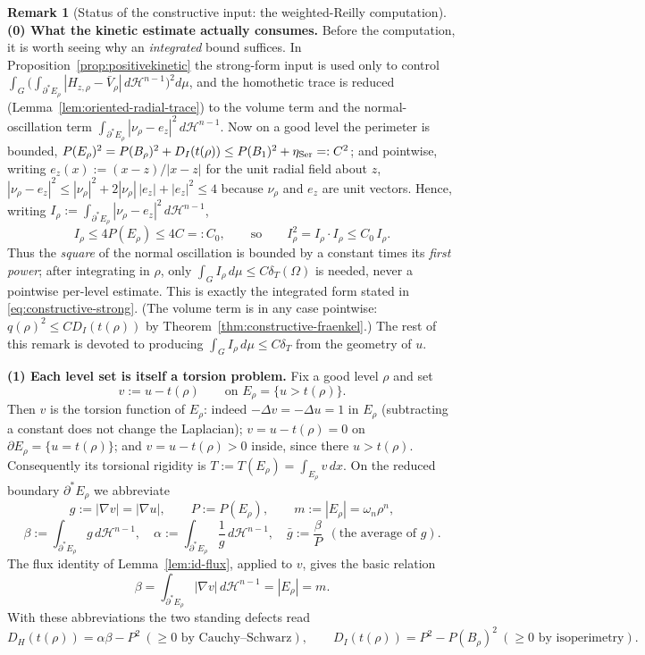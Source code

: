 \documentclass[11pt]{amsart}
\theoremstyle{definition}
\newtheorem{remark}[theorem]{Remark}
\newcommand{\Om}{\Omega}
\newcommand{\dT}{\delta_T}
\newcommand{\Hn}{\mathcal H^{n-1}}
\newcommand{\Per}{P}
\begin{document}
\begin{remark}[Status of the constructive input: the weighted-Reilly computation]
\medskip
\noindent\textbf{(0) What the kinetic estimate actually consumes.}
Before the computation, it is worth seeing why an \emph{integrated} bound
suffices.  In Proposition~\ref{prop:positivekinetic} the strong-form input is
used only to control
\(\int_G\bigl(\int_{\partial^*E_\rho}|H_{z,\rho}-\bar V_\rho|\,d\Hn\bigr)^2d\mu\),
and the homothetic trace is reduced (Lemma~\ref{lem:oriented-radial-trace}) to
the volume term and the normal-oscillation term
\(\int_{\partial^*E_\rho}|\nu_\rho-e_z|^2\,d\Hn\).  Now on a good level the perimeter is bounded,
\(\Per(E_\rho)^2=\Per(B_\rho)^2+D_I(t(\rho))\le\Per(B_1)^2+\eta_{\rm Ser}=:C^2\);
and pointwise, writing \(e_z(x):=(x-z)/|x-z|\) for the unit radial field about
\(z\), \(|\nu_\rho-e_z|^2\le|\nu_\rho|^2+2|\nu_\rho|\,|e_z|+|e_z|^2\le4\) because
\(\nu_\rho\) and \(e_z\) are unit vectors.
Hence, writing \(I_\rho:=\int_{\partial^*E_\rho}|\nu_\rho-e_z|^2\,d\Hn\),
\[
   I_\rho\le4\Per(E_\rho)\le 4C=:C_0,
   \qquad\text{so}\qquad
   I_\rho^2=I_\rho\cdot I_\rho\le C_0\,I_\rho .
\]
Thus the \emph{square} of the normal oscillation is bounded by a constant times
its \emph{first power}; after integrating in \(\rho\), only
\(\int_G I_\rho\,d\mu\le C\dT(\Om)\) is needed, never a pointwise per-level
estimate.  This is exactly the integrated form stated in
\eqref{eq:constructive-strong}.  (The volume term is in any case pointwise:
\(q(\rho)^2\le CD_I(t(\rho))\) by Theorem~\ref{thm:constructive-fraenkel}.)  The
rest of this remark is devoted to producing \(\int_G I_\rho\,d\mu\le C\dT\) from
the geometry of \(u\).

\medskip
\noindent\textbf{(1) Each level set is itself a torsion problem.}
Fix a good level \(\rho\) and set
\[
   v:=u-t(\rho)\qquad\text{on }E_\rho=\{u>t(\rho)\}.
\]
Then \(v\) is the torsion function of \(E_\rho\): indeed \(-\Delta v=-\Delta
u=1\) in \(E_\rho\) (subtracting a constant does not change the Laplacian);
\(v=u-t(\rho)=0\) on \(\partial E_\rho=\{u=t(\rho)\}\); and \(v=u-t(\rho)>0\)
inside, since there \(u>t(\rho)\).  Consequently its torsional rigidity is
\(T:=T(E_\rho)=\int_{E_\rho}v\,dx\).  On the reduced boundary
\(\partial^*E_\rho\) we abbreviate
\[
   g:=|\nabla v|=|\nabla u|,\qquad
   P:=\Per(E_\rho),\qquad
   m:=|E_\rho|=\omega_n\rho^n,
\]
\[
   \beta:=\int_{\partial^*E_\rho}g\,d\Hn,\quad
   \alpha:=\int_{\partial^*E_\rho}\frac1g\,d\Hn,\quad
   \bar g:=\frac{\beta}{P}\ \ (\text{the average of }g).
\]
The flux identity of Lemma~\ref{lem:id-flux}, applied to \(v\), gives the basic
relation
\begin{equation}\label{eq:flux-recall}
   \beta=\int_{\partial^*E_\rho}|\nabla v|\,d\Hn=|E_\rho|=m .
\end{equation}
With these abbreviations the two standing defects read
\[
   D_H(t(\rho))=\alpha\beta-P^2\ (\ge0\text{ by Cauchy--Schwarz}),
   \qquad
   D_I(t(\rho))=P^2-\Per(B_\rho)^2\ (\ge0\text{ by isoperimetry}).
\]


\end{remark}
\end{document}

